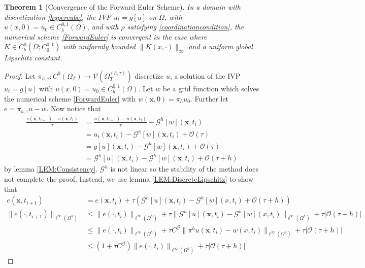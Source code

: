 \documentclass[aps,
preprint,
groupedaddress,
showkeys,
amsmath]{revtex4-2}
\newtheorem{theorem}{Theorem}
\begin{document}
    \begin{theorem}[Convergence of the Forward Euler Scheme]\label{THM:Convergence}
    In a domain with discretization \eqref{hypercube}, the IVP $u_t=g[u]$ on $\Omega$, with $u(x,0)=u_0\in C^{0,1}_b(\Omega)$, and with $\rho$ satisfying \eqref{coordinationcondition}, the numerical scheme \eqref{ForwardEuler} is convergent in the case where $K\in C^0_b(\Omega;C^{0,1}_0)$ with uniformly bounded $\|K(x,\cdot)\|_\infty$ and a uniform global Lipschitz constant.
    \end{theorem}
        
    \begin{proof}
        Let $\pi_{h,\tau}:C^0(\Omega_T)\rightarrow \mathcal{V}(\Omega^{(h,\tau)}_T)$ discretize $u$, a solution of the IVP $u_t=g[u]$ with $u(x,0)=u_0\in C^{0,1}_b(\Omega)$. Let $w$ be a grid function which solves the numerical scheme \eqref{ForwardEuler} with $w(\mathbf{x},0)=\pi_h u_0$. Further let $e=\pi_{h,\tau} u- w$. Now notice that 
        \begin{equation}
            \begin{split}
            \frac{e(\mathbf{x},t_{i+1})-e(\mathbf{x},t_{i})}{\tau}&=\frac{u(\mathbf{x},t_{i+1})-u(\mathbf{x},t_{i})}{\tau}- \mathcal{G}^h[w](\mathbf{x},t_i)\\
            &=u_t(\mathbf{x},t_i)-\mathcal{G}^h[w](\mathbf{x},t_i)+\mathcal{O}(\tau)\\
            &=g[u](\mathbf{x},t_i)-\mathcal{G}^h[w](\mathbf{x},t_i)+\mathcal{O}(\tau)\\
            &=\mathcal{G}^h[u](\mathbf{x},t_i)-\mathcal{G}^h[w](\mathbf{x},t_i)+\mathcal{O}(\tau+h)
            \end{split}
        \end{equation}
        by lemma \ref{LEM:Consistency}. $\mathcal{G}^h$ is not linear so the stability of the method does not complete the proof. Instead, we use lemma \ref{LEM:DiscreteLipschitz} to show that
        \begin{equation*}
            \begin{split}
        e(\mathbf{x},t_{i+1}) &=e(\mathbf{x},t_{i})+\tau\left(\mathcal{G}^h[u](\mathbf{x},t_i)-\mathcal{G}^h[w](x,t_i)+\mathcal{O}(\tau+h)\right)\\
        \|e(\cdot, t_{i+1})\|_{\ell^\infty(\Omega^h)}&\leq\|e(\cdot, t_{i})\|_{\ell^\infty(\Omega^h)}+ \tau \|\mathcal{G}^h[u](\mathbf{x},t_i)-\mathcal{G}^h[w](x,t_i)\|_{\ell^\infty(\Omega^h)}+\tau|\mathcal{O}(\tau+h)|\\
        &\leq\|e(\cdot, t_{i})\|_{\ell^\infty(\Omega^h)}+ \tau C^\mathcal{G}\|\pi^h u(\mathbf{x},t_i)-w(x,t_i)\|_{\ell^\infty(\Omega^h)}+\tau|\mathcal{O}(\tau+h)|\\
        &\leq (1+\tau C^\mathcal{G})\|e(\cdot, t_i)\|_{\ell^\infty(\Omega^h)}+\tau|\mathcal{O}(\tau +h)|
        \end{split}
        \end{equation*}


\end{proof}
\end{document}
